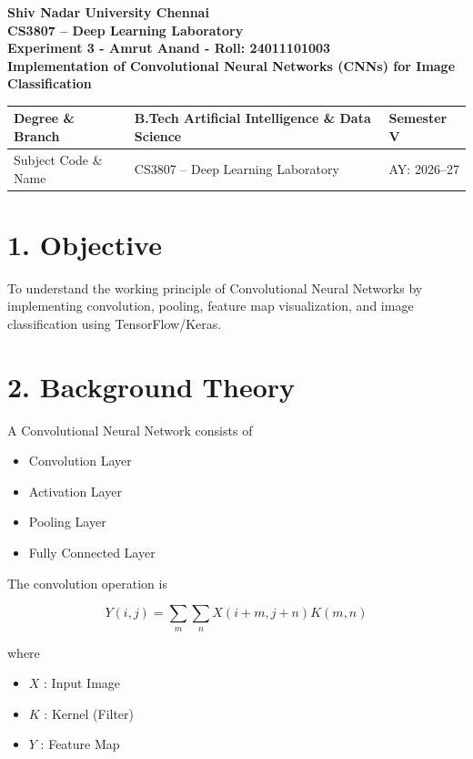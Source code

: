 \documentclass[11pt]{article}
\begin{document}
\begin{center}
{\Large\textbf{Shiv Nadar University Chennai}}\\
\textbf{CS3807 -- Deep Learning Laboratory}\\
\textbf{Experiment 3 - Amrut Anand - Roll: 24011101003}\\
{\large\textbf{Implementation of Convolutional Neural Networks (CNNs) for Image Classification}}
\end{center}

\renewcommand{\arraystretch}{1.25}

\begin{tabular}{|p{3.8cm}|p{8cm}|p{2cm}|}
\hline
Degree \& Branch & B.Tech Artificial Intelligence \& Data Science & Semester V\\ \hline
Subject Code \& Name & CS3807 -- Deep Learning Laboratory & AY: 2026--27\\ \hline
\end{tabular}

\section*{1. Objective}

To understand the working principle of Convolutional Neural Networks by implementing convolution, pooling, feature map visualization, and image classification using TensorFlow/Keras.

\section*{2. Background Theory}

A Convolutional Neural Network consists of

\begin{itemize}
\item Convolution Layer
\item Activation Layer
\item Pooling Layer
\item Fully Connected Layer
\end{itemize}

The convolution operation is

\[
Y(i,j)=\sum_m\sum_n X(i+m,j+n)K(m,n)
\]

where

\begin{itemize}
\item $X$ : Input Image
\item $K$ : Kernel (Filter)
\item $Y$ : Feature Map
\end{itemize}
\end{document}
